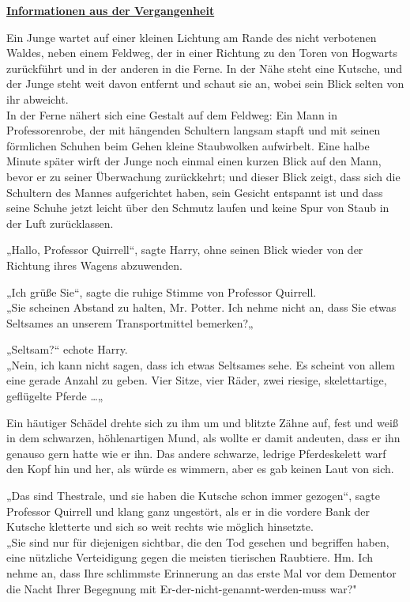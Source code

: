 

\hypertarget{informationen-aus-der-vergangenheit}{%

\textbf{\uline{Informationen aus der Vergangenheit}}

\hfill\break Ein Junge wartet auf einer kleinen Lichtung am Rande des nicht verbotenen Waldes, neben einem Feldweg, der in einer Richtung zu den Toren von Hogwarts zurückführt und in der anderen in die Ferne. In der Nähe steht eine Kutsche, und der Junge steht weit davon entfernt und schaut sie an, wobei sein Blick selten von ihr abweicht.\\ In der Ferne nähert sich eine Gestalt auf dem Feldweg: Ein Mann in Professorenrobe, der mit hängenden Schultern langsam stapft und mit seinen förmlichen Schuhen beim Gehen kleine Staubwolken aufwirbelt. Eine halbe Minute später wirft der Junge noch einmal einen kurzen Blick auf den Mann, bevor er zu seiner Überwachung zurückkehrt; und dieser Blick zeigt, dass sich die Schultern des Mannes aufgerichtet haben, sein Gesicht entspannt ist und dass seine Schuhe jetzt leicht über den Schmutz laufen und keine Spur von Staub in der Luft zurücklassen.

„Hallo, Professor Quirrell“, sagte Harry, ohne seinen Blick wieder von der Richtung ihres Wagens abzuwenden.

„Ich grüße Sie“, sagte die ruhige Stimme von Professor Quirrell.\\ „Sie scheinen Abstand zu halten, Mr. Potter. Ich nehme nicht an, dass Sie etwas Seltsames an unserem Transportmittel bemerken?„

„Seltsam?“ echote Harry.\\ „Nein, ich kann nicht sagen, dass ich etwas Seltsames sehe. Es scheint von allem eine gerade Anzahl zu geben. Vier Sitze, vier Räder, zwei riesige, skelettartige, geflügelte Pferde …„

Ein häutiger Schädel drehte sich zu ihm um und blitzte Zähne auf, fest und weiß in dem schwarzen, höhlenartigen Mund, als wollte er damit andeuten, dass er ihn genauso gern hatte wie er ihn. Das andere schwarze, ledrige Pferdeskelett warf den Kopf hin und her, als würde es wimmern, aber es gab keinen Laut von sich.

„Das sind Thestrale, und sie haben die Kutsche schon immer gezogen“, sagte Professor Quirrell und klang ganz ungestört, als er in die vordere Bank der Kutsche kletterte und sich so weit rechts wie möglich hinsetzte.\\ „Sie sind nur für diejenigen sichtbar, die den Tod gesehen und begriffen haben, eine nützliche Verteidigung gegen die meisten tierischen Raubtiere. Hm. Ich nehme an, dass Ihre schlimmste Erinnerung an das erste Mal vor dem Dementor die Nacht Ihrer Begegnung mit Er-der-nicht-genannt-werden-muss war?"

}
